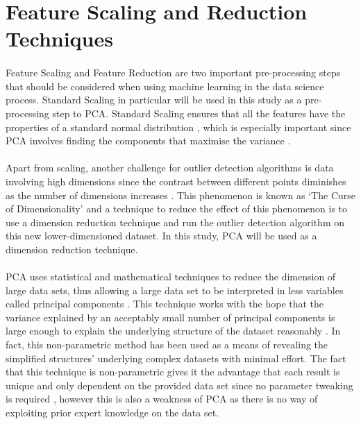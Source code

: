 

\section{Feature Scaling and Reduction Techniques}

\paragraph{ }Feature Scaling and Feature Reduction are two important pre-processing steps that should be considered when using machine learning in the data science process. Standard Scaling in particular will be used in this study as a pre-processing step to \ac{PCA}. Standard Scaling ensures that all the features have the properties of a standard normal distribution \cite{Scikitlearn}, which is especially important since \acs{PCA} involves finding the components that maximise the variance \cite{Shlens2014}. 

\paragraph{ }Apart from scaling, another challenge for outlier detection algorithms is data involving high dimensions since the contrast between different points diminishes as the number of dimensions increases \cite{Zimek2012}. This phenomenon is known as `The Curse of Dimensionality' and a technique to reduce the effect of this phenomenon is to use a dimension reduction technique and run the outlier detection algorithm on this new lower-dimensioned dataset. In this study, \acs{PCA} will be used as a dimension reduction technique.

\paragraph{ }\acs{PCA} uses statistical and mathematical techniques to reduce the dimension of large data sets, thus allowing a large data set to be interpreted in less variables called principal components \cite{Richardson2009}. This technique works with the hope that the variance explained by an acceptably small number of principal components is large enough to explain the underlying structure of the dataset reasonably \cite{Shlens2014}. In fact, this non-parametric method has been used as a means of revealing the simplified structures' underlying complex datasets with minimal effort. The fact that this technique is non-parametric gives it the advantage that each result is unique and only dependent on the provided data set since no parameter tweaking is required \cite{Shlens2014}, however this is also a weakness of \acs{PCA} as there is no way of exploiting prior expert knowledge on the data set.

